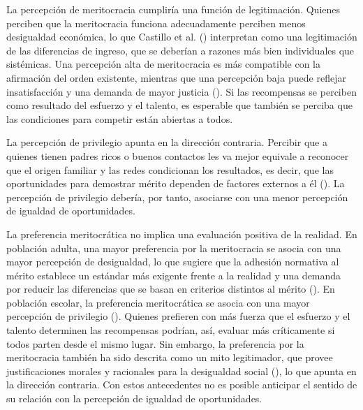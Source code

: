 \documentclass[
  spanish,
  a4paper,
  oneside]{scrbook}
\begin{document}
La percepción de meritocracia cumpliría una función de legitimación.
Quienes perciben que la meritocracia funciona adecuadamente perciben
menos desigualdad económica, lo que Castillo et al.
() interpretan como una
legitimación de las diferencias de ingreso, que se deberían a razones
más bien individuales que sistémicas. Una percepción alta de
meritocracia es más compatible con la afirmación del orden existente,
mientras que una percepción baja puede reflejar insatisfacción y una
demanda de mayor justicia (). Si las recompensas se perciben como resultado del
esfuerzo y el talento, es esperable que también se perciba que las
condiciones para competir están abiertas a todos.

La percepción de privilegio apunta en la dirección contraria. Percibir
que a quienes tienen padres ricos o buenos contactos les va mejor
equivale a reconocer que el origen familiar y las redes condicionan los
resultados, es decir, que las oportunidades para demostrar mérito
dependen de factores externos a él (). La percepción de privilegio debería, por tanto, asociarse con
una menor percepción de igualdad de oportunidades.

La preferencia meritocrática no implica una evaluación positiva de la
realidad. En población adulta, una mayor preferencia por la meritocracia
se asocia con una mayor percepción de desigualdad, lo que sugiere que la
adhesión normativa al mérito establece un estándar más exigente frente a
la realidad y una demanda por reducir las diferencias que se basan en
criterios distintos al mérito
(). En
población escolar, la preferencia meritocrática se asocia con una mayor
percepción de privilegio (). Quienes prefieren con más fuerza que el esfuerzo y el talento
determinen las recompensas podrían, así, evaluar más críticamente si
todos parten desde el mismo lugar. Sin embargo, la preferencia por la
meritocracia también ha sido descrita como un mito legitimador, que
provee justificaciones morales y racionales para la desigualdad social
(), lo
que apunta en la dirección contraria. Con estos antecedentes no es
posible anticipar el sentido de su relación con la percepción de
igualdad de oportunidades.
\end{document}
